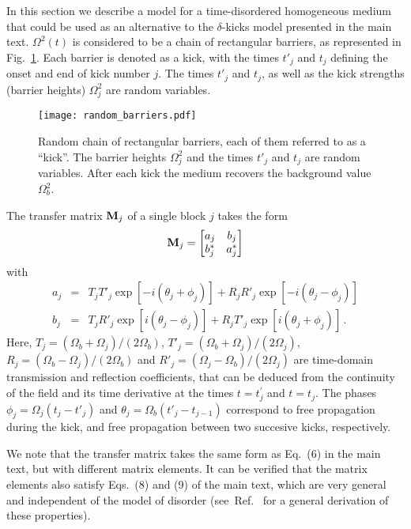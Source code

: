 \documentclass[ prl, twocolumn, superscriptaddress, amsfonts, amsmath,floatfix]{revtex4-1}
\newcommand{\Mg}{{\bf M}}
\begin{document}
In this section we describe a model for a time-disordered homogeneous medium that could be used as an alternative to the $\delta$-kicks model presented in the main text. $\Omega^2(t)$ is considered to be a chain of rectangular barriers, as represented in Fig.~\ref{fig:random_barriers}. Each barrier is denoted as a kick, with the times $t'_j$  and $t_j$ defining the onset and end of kick number $j$. The times $t'_j$  and $t_j$, as well as the kick strengths (barrier heights) $\Omega^2_j$ are random variables.
%
\begin{figure}[h]
     \begin{center}
     \texttt{[image: random\_barriers.pdf]}
     \end{center}    
     \caption{\label{fig:random_barriers} Random chain of rectangular barriers, each of them referred to as a ``kick''. The barrier heights $\Omega^2_j$ and the times $t'_j$ and $t_j$ are random variables. After each kick the medium recovers the background value $\Omega^2_b$.}
\end{figure}
%

The transfer matrix $\Mg_j$ of a single block $j$ takes the form
\begin{equation}
\Mg_j
=
\begin{bmatrix}
a_j & b_j \\
b_j^* & a_j^*
\end{bmatrix}
\label{eq:Mj_general2}
\end{equation}
with
\begin{eqnarray}\label{a_coeff}
   a_j &=& T_j T'_j  \exp[-i(\theta_j+\phi_j)] + R_j R'_j \exp[-i(\theta_j-\phi_j)]
\\\label{b_coeff}
   b_j &=& T_j R'_j  \exp[i(\theta_j-\phi_j)] + R_j T'_j \exp[i(\theta_j+\phi_j)] \, .
\end{eqnarray}
Here, $T_j = (\Omega_b+\Omega_j)/(2\Omega_b)$, $T'_j = (\Omega_b+\Omega_j)/(2\Omega_j)$, $R_j = (\Omega_b-\Omega_j)/(2\Omega_b)$ and $R'_j = (\Omega_j-\Omega_b)/(2\Omega_j)$ are time-domain transmission and reflection coefficients, that can be deduced from the continuity of the field and its time derivative at the times $t=t^\prime_j$ and $t=t_j$. The phases $\phi_j=\Omega_j(t_j-t'_j)$ and $\theta_j=\Omega_b(t'_j-t_{j-1})$ correspond to free propagation during the kick, and free propagation between two succesive kicks, respectively. 

We note that the transfer matrix takes the same form as Eq.~(6) in the main text, but with different matrix elements. It can be verified that the matrix elements also satisfy Eqs.~(8) and (9) of the main text, which are very general and independent of the model of disorder (see~Ref.~\cite{MelloBook} for a general derivation of these properties).
\end{document}
